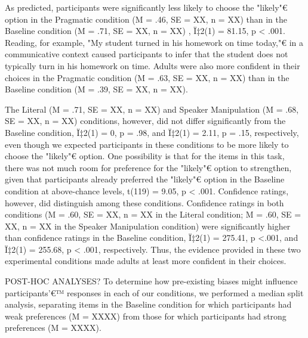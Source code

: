 \documentclass[10pt,letterpaper]{article}
\begin{document}
As predicted, participants were significantly less likely to choose the "likely"€ option in the Pragmatic condition (M = .46, SE = XX, n = XX) than in the Baseline condition (M = .71, SE = XX, n = XX) , Ï‡2(1) = 81.15, p < .001.  Reading, for example, "My student turned in his homework on time today,"€ in a communicative context caused participants to infer that the student does not typically turn in his homework on time.  Adults were also more confident in their choices in the Pragmatic condition (M = .63, SE = XX, n = XX) than in the Baseline condition (M = .39, SE = XX, n = XX).

The Literal (M = .71, SE = XX, n = XX) and Speaker Manipulation (M = .68,  SE = XX, n = XX) conditions, however, did not differ significantly from the Baseline condition, Ï‡2(1) = 0, p = .98, and Ï‡2(1) = 2.11, p = .15, respectively, even though we expected participants in these conditions to be more likely to choose the "likely"€ option.  One possibility is that for the items in this task, there was not much room for preference for the "likely"€ option to strengthen, given that participants already preferred the "likely"€ option in the Baseline condition at above-chance levels, t(119) = 9.05, p < .001.  Confidence ratings, however, did distinguish among these conditions.  Confidence ratings in both conditions (M = .60, SE = XX, n = XX in the Literal condition; M = .60, SE = XX, n = XX in the Speaker Manipulation condition) were significantly higher than confidence ratings in the Baseline condition,  Ï‡2(1) = 275.41, p <.001, and Ï‡2(1) = 255.68, p < .001, respectively.  Thus, the evidence provided in these two experimental conditions made adults at least more confident in their choices.  

POST-HOC ANALYSES?
To determine how pre-existing biases might influence participants'€™ responses in each of our conditions, we performed a median split analysis, separating items in the Baseline condition for which participants had weak preferences (M  = XXXX) from those for which participants had strong preferences (M = XXXX).  


\end{document}

